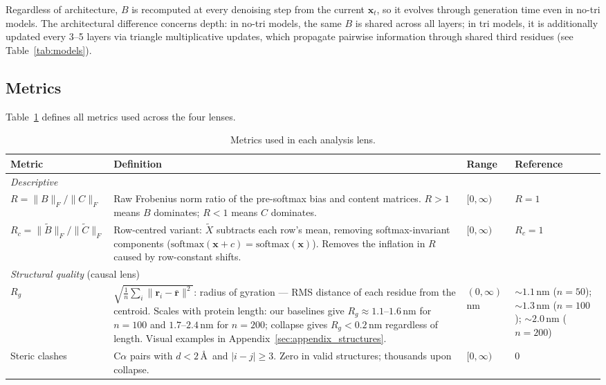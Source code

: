 \documentclass{article}
\begin{document}
Regardless of architecture, $B$ is recomputed at every denoising step from the current $\mathbf{x}_t$, so it evolves through generation time even in no-tri models.
The architectural difference concerns depth: in no-tri models, the same $B$ is shared across all layers; in tri models, it is additionally updated every 3--5 layers via triangle multiplicative updates, which propagate pairwise information through shared third residues (see Table~\ref{tab:models}).

\subsection{Metrics}

Table~\ref{tab:metrics} defines all metrics used across the four lenses.

\begin{table}[h]
    \centering
    \caption{Metrics used in each analysis lens.}
    \label{tab:metrics}
    \begin{tabular}{p{2.5cm}p{7.2cm}p{1.6cm}p{2.2cm}}
        \toprule
        Metric & Definition & Range & Reference \\
        \midrule
        \multicolumn{4}{l}{\emph{Descriptive}} \\[2pt]
        $R = \|B\|_F / \|C\|_F$ & Raw Frobenius norm ratio of the pre-softmax bias and content matrices. $R{>}1$ means $B$ dominates; $R{<}1$ means $C$ dominates. & $[0, \infty)$ & $R = 1$ \\[4pt]
        $R_c = \|\tilde{B}\|_F / \|\tilde{C}\|_F$ & Row-centred variant: $\tilde{X}$ subtracts each row's mean, removing softmax-invariant components ($\mathrm{softmax}(\mathbf{x} + c) = \mathrm{softmax}(\mathbf{x})$). Removes the inflation in $R$ caused by row-constant shifts. & $[0, \infty)$ & $R_c = 1$ \\[4pt]
        \midrule
        \multicolumn{4}{l}{\emph{Structural quality} (causal lens)} \\[2pt]
        $R_g$ & $\sqrt{\frac{1}{n}\sum_i \|\mathbf{r}_i - \bar{\mathbf{r}}\|^2}$: radius of gyration --- RMS distance of each residue from the centroid. Scales with protein length: our baselines give $R_g \approx 1.1$--$1.6$\,nm for $n{=}100$ and $1.7$--$2.4$\,nm for $n{=}200$; collapse gives $R_g < 0.2$\,nm regardless of length. Visual examples in Appendix~\ref{sec:appendix_structures}. & $(0, \infty)$ nm & ${\sim}1.1$\,nm ($n{=}50$); ${\sim}1.3$\,nm ($n{=}100$); ${\sim}2.0$\,nm ($n{=}200$) \\[4pt]
        Steric clashes & C$\alpha$ pairs with $d < 2$\,\AA\ and $|i{-}j| \geq 3$. Zero in valid structures; thousands upon collapse. & $[0, \infty)$ & 0 \\[4pt]

\end{tabular}
\end{table}
\end{document}
